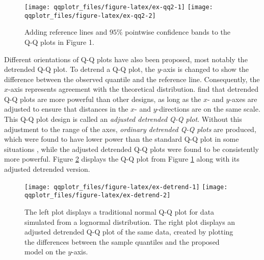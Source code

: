 \begin{Schunk}
\begin{figure}

{\centering \texttt{[image: qqplotr\_files/figure-latex/ex-qq2-1]} \texttt{[image: qqplotr\_files/figure-latex/ex-qq2-2]} 

}

\caption[Adding reference lines and $95\%$ pointwise confidence bands to the Q-Q plots in Figure 1]{Adding reference lines and $95\%$ pointwise confidence bands to the Q-Q plots in Figure 1.}\label{fig:ex-qq2}
\end{figure}
\end{Schunk}

Different orientations of Q-Q plots have also been proposed, most
notably the detrended Q-Q plot. To detrend a Q-Q plot, the \(y\)-axis is
changed to show the difference between the observed quantile and the
reference line. Consequently, the \(x\)-axis represents agreement with
the theoretical distribution. \citet{Loy2016-fg} find that detrended Q-Q
plots are more powerful than other designs, as long as the \(x\)- and
\(y\)-axes are adjusted to ensure that distances in the \(x\)- and
\(y\)-directions are on the same scale. This Q-Q plot design is called
an \emph{adjusted detrended Q-Q plot}. Without this adjustment to the
range of the axes, \emph{ordinary detrended Q-Q plots} are produced,
which were found to have lower power than the standard Q-Q plot in some
situations \citep{Loy2016-fg}, while the adjusted detrended Q-Q plots
were found to be consistently more powerful. Figure \ref{fig:ex-detrend}
displays the Q-Q plot from Figure \ref{fig:ex-qq2} along with its
adjusted detrended version.

\begin{Schunk}
\begin{figure}

{\centering \texttt{[image: qqplotr\_files/figure-latex/ex-detrend-1]} \texttt{[image: qqplotr\_files/figure-latex/ex-detrend-2]} 

}

\caption[The left plot displays a traditional normal Q-Q plot for data simulated from a lognormal distribution]{The left plot displays a traditional normal Q-Q plot for data simulated from a lognormal distribution. The right plot displays an adjusted detrended Q-Q plot of the same data, created by plotting the differences between the sample quantiles and the proposed model on the $y$-axis.}\label{fig:ex-detrend}
\end{figure}
\end{Schunk}


